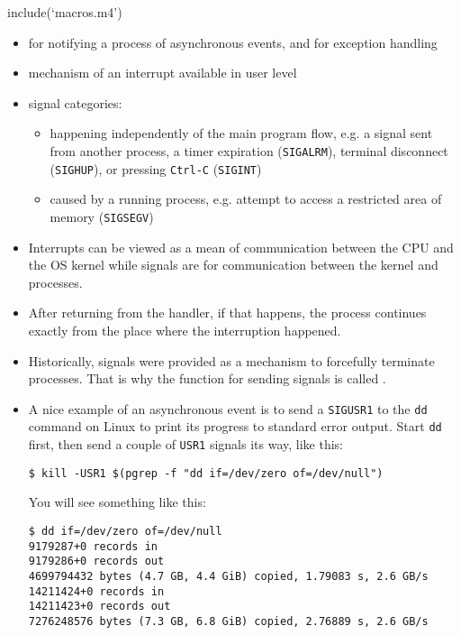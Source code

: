 include(`macros.m4')


\begin{slide}
\end{slide}


\begin{slide}
\begin{itemize}
\item for notifying a process of asynchronous events, and for exception handling
\item mechanism of an interrupt available in user level
\item signal categories:
    \begin{itemize}
    \item {} happening independently of the main program
    flow, e.g. a signal sent from another process, a timer expiration
    (\texttt{SIGALRM}), terminal disconnect (\texttt{SIGHUP}), or pressing
    \texttt{Ctrl-C} (\texttt{SIGINT})
    \item {} caused by a running process, e.g.
    attempt to access a restricted area of memory (\texttt{SIGSEGV})
    \end{itemize}
\end{itemize}
\end{slide}

\label{SIGNALS}

\begin{itemize}
\item Interrupts can be viewed as a mean of communication between the CPU and
the OS kernel while signals are for communication between the kernel and
processes.
\item After returning from the handler, if that happens, the process continues
exactly from the place where the interruption happened.
\item Historically, signals were provided as a mechanism to forcefully terminate
processes.  That is why the function for sending signals is called
.
\item A nice example of an asynchronous event is to send a \texttt{SIGUSR1} to
the \texttt{dd} command on Linux to print its progress to standard error output.
Start \texttt{dd} first, then send a couple of \texttt{USR1} signals its way,
like this:

\begin{verbatim}
$ kill -USR1 $(pgrep -f "dd if=/dev/zero of=/dev/null")
\end{verbatim}

You will see something like this:

\begin{verbatim}
$ dd if=/dev/zero of=/dev/null
9179287+0 records in
9179286+0 records out
4699794432 bytes (4.7 GB, 4.4 GiB) copied, 1.79083 s, 2.6 GB/s
14211424+0 records in
14211423+0 records out
7276248576 bytes (7.3 GB, 6.8 GiB) copied, 2.76889 s, 2.6 GB/s
\end{verbatim}
\end{itemize}

